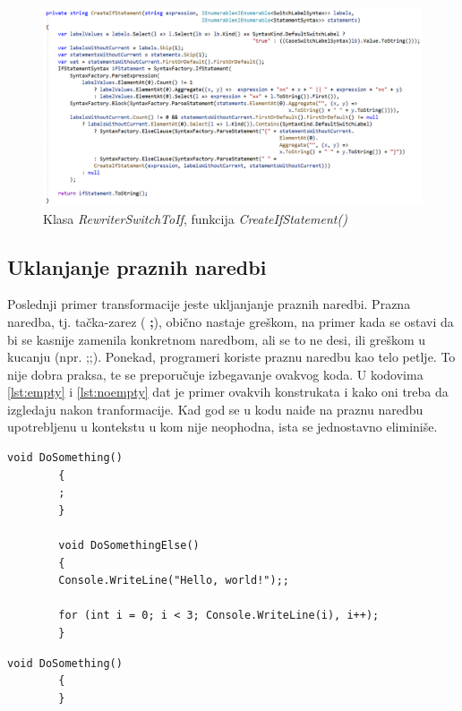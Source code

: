 \documentclass[a4paper]{article}
\begin{document}
{		\begin{figure}[!htb]
			\begin{center}
				\includegraphics[scale=0.44]{images/RewriterSwitchToIf_part2.png}
			\end{center}
			\caption{Klasa \textit{RewriterSwitchToIf}, funkcija \textit{CreateIfStatement()}}
			\label{fig:RewriterSwitchToIf_part2}
		\end{figure}
		
		\subsection{Uklanjanje praznih naredbi}
		\label{subsec:prazne}
		Poslednji primer transformacije jeste ukljanjanje praznih naredbi. Prazna naredba, tj. tačka-zarez ( \textbf{;}), obično nastaje greškom, na primer kada se ostavi da bi se kasnije zamenila konkretnom naredbom, ali se to ne desi, ili greškom u kucanju (npr. ;;). Ponekad, programeri koriste praznu naredbu kao telo petlje. To nije dobra praksa, te se preporučuje izbegavanje ovakvog koda. U kodovima \ref{lst:empty} i \ref{lst:noempty} dat je primer ovakvih konstrukata i kako oni treba da izgledaju nakon tranformacije. Kad god se u kodu naiđe na praznu naredbu upotrebljenu u kontekstu u kom nije neophodna, ista se jednostavno eliminiše. 
		
		
		\begin{lstlisting}[caption={Prazna naredba}, label=lst:empty]
		void DoSomething()
		{
		; 
		}
		
		void DoSomethingElse()
		{
		Console.WriteLine("Hello, world!");; 
		
		for (int i = 0; i < 3; Console.WriteLine(i), i++); 
		}
		\end{lstlisting}
		
		
		\begin{lstlisting}[caption={Uklonjena prazna naredba}, label=lst:noempty]
		void DoSomething()
		{
		}
		

\end{lstlisting}}
\end{document}
